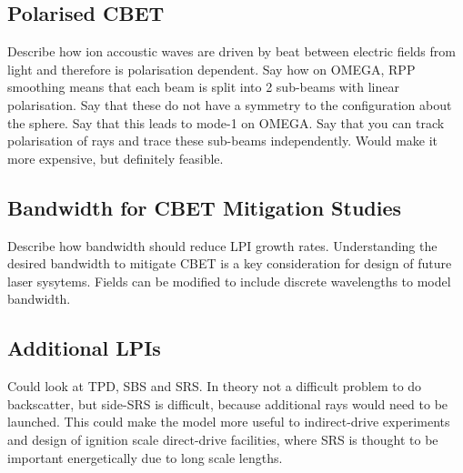 \subsection{Polarised CBET}

Describe how ion accoustic waves are driven by beat between electric fields from light and therefore is polarisation dependent.
Say how on OMEGA, RPP smoothing means that each beam is split into 2 sub-beams with linear polarisation.
Say that these do not have a symmetry to the configuration about the sphere.
Say that this leads to mode-1 on OMEGA.
Say that you can track polarisation of rays and trace these sub-beams independently.
Would make it more expensive, but definitely feasible.

\subsection{Bandwidth for CBET Mitigation Studies}

Describe how bandwidth should reduce LPI growth rates.
Understanding the desired bandwidth to mitigate CBET is a key consideration for design of future laser sysytems.
Fields can be modified to include discrete wavelengths to model bandwidth.

\subsection{Additional LPIs}

Could look at TPD, SBS and SRS.
In theory not a difficult problem to do backscatter, but side-SRS is difficult, because additional rays would need to be launched.
This could make the model more useful to indirect-drive experiments and design of ignition scale direct-drive facilities, where SRS is thought to be important energetically due to long scale lengths.



